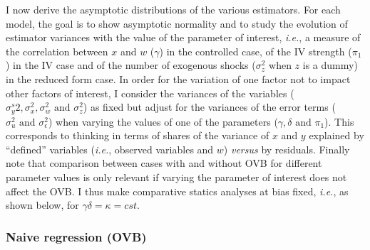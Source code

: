 \documentclass[usletter, 12pt]{article}
\begin{document}
			I now derive the asymptotic distributions of the various estimators. For each model, the goal is to show asymptotic normality and to study the evolution of estimator variances with the value of the parameter of interest, \textit{i.e.}, a measure of the correlation between $x$ and $w$ ($\gamma$) in the controlled case, of the IV strength ($\pi_{1}$) in the IV case and of the number of exogenous shocks ($\sigma_{z}^{2}$ when $z$ is a dummy) in the reduced form case.  %
			In order for the variation of one factor not to impact other factors of interest, I consider the variances of the variables ($\sigma_{y}^s{2}, \sigma_{x}^{2}, \sigma_{w}^{2} \text{ and } \sigma_{z}^{2}$) as fixed but adjust for the variances of the error terms ($\sigma_{u}^{2} \text{ and } \sigma_{\epsilon}^{2}$) when varying the values of one of the parameters ($\gamma, \delta \text{ and } \pi_{1}$). This corresponds to thinking in terms of shares of the variance of $x$ and $y$ explained by ``defined'' variables (\textit{i.e.}, observed variables and $w$) \textit{versus} by residuals. Finally note that comparison between cases with and without OVB for different parameter values is only relevant if varying the parameter of interest does not affect the OVB. I thus make comparative statics analyses at bias fixed, \textit{i.e.}, as shown below, for $\gamma \delta = \kappa = cst$.
			

			\subsubsection{Naive regression (OVB)}\label{formal_proof_ovb}
			
\end{document}
